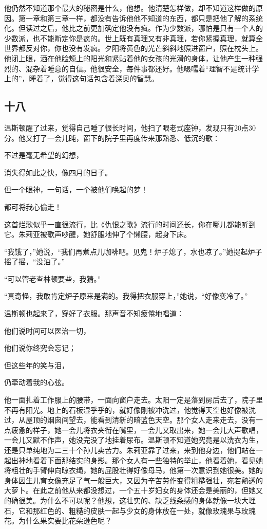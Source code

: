 他仍然不知道那个最大的秘密是什么，他想。他清楚怎样做，却不知道这样做的原因。第一章和第三章一样，都没有告诉他他不知道的东西，都只是把他了解的系统化。但读过之后，他比之前更加确定他没有疯。作为少数派，哪怕是只有一个人的少数派，也不能断定你是疯的。世上既有真理又有非真理，若你紧握真理，就算全世界都反对你，你也没有发疯。夕阳将黄色的光芒斜斜地照进窗户，照在枕头上。他闭上眼，洒在他脸颊上的阳光和紧贴着他的女孩的光滑的身体，让他产生一种强烈的、混杂着睡意的自信。他很安全，每件事都还好。他嗫嚅着``理智不是统计学上的''，睡着了，觉得这句话包含着深奥的智慧。

\subsection{十八}\label{ux5341ux516b}

温斯顿醒了过来，觉得自己睡了很长时间，他扫了眼老式座钟，发现只有20点30分。他又打了一会儿盹，窗下的院子里再度传来那熟悉、低沉的歌：

不过是毫无希望的幻想，

消失得如此之快，像四月的日子。

但一个眼神，一句话，一个被他们唤起的梦！

都可将我心偷走！

这首烂歌似乎一直很流行，比《仇恨之歌》流行的时间还长，你在哪儿都能听到它。朱莉亚被歌声吵醒，她舒服地伸了个懒腰，起身下床。

``我饿了，''她说，``我们再煮点儿咖啡吧。见鬼！炉子熄了，水也凉了。''她提起炉子摇了摇，``没油了。''

``可以管老查林顿要些，我猜。''

``真奇怪，我敢肯定炉子原来是满的。我得把衣服穿上，''她说，``好像变冷了。''

温斯顿也起来了，穿好了衣服。那声音不知疲倦地唱道：

他们说时间可以医治一切，

他们说你终究会忘记；

但这些年的笑与泪，

仍牵动着我的心弦。

他一面扎着工作服上的腰带，一面向窗户走去。太阳一定是落到房后去了，院子里不再有阳光。地上的石板湿乎乎的，就好像刚被冲洗过，他觉得天空也好像被洗过，从屋顶的烟囱间望去，能看到清新的暗蓝色天空。那个女人走来走去，没有一点疲惫的样子，她一会儿将衣夹衔在嘴里，一会儿又取出来，她一会儿大声歌唱，一会儿又默不作声，她没完没了地挂着尿布。温斯顿不知道她究竟是以洗衣为生，还是只单纯地为二三十个孙儿卖苦力。朱莉亚靠了过来，来到他身边，他们站在一起出神地看着下面那结实的身影。那个女人有一些独特的举止，他看着她，看见她将粗壮的手臂伸向晾衣绳，她的屁股壮得好像母马，他第一次意识到她很美。她的身体因生儿育女像充足了气一般巨大，又因为辛苦劳作变得粗糙强壮，宛若熟透的大萝卜。在此之前他从来都没想过，一个五十岁妇女的身体还会是美丽的，但她又的确很美。为什么不可以呢？他想，这壮实的、缺乏线条感的身体就像一块大理石，它和那红色的、粗糙的皮肤一起与少女的身体放在一处，就像玫瑰果与玫瑰花。为什么果实要比花朵逊色呢？

